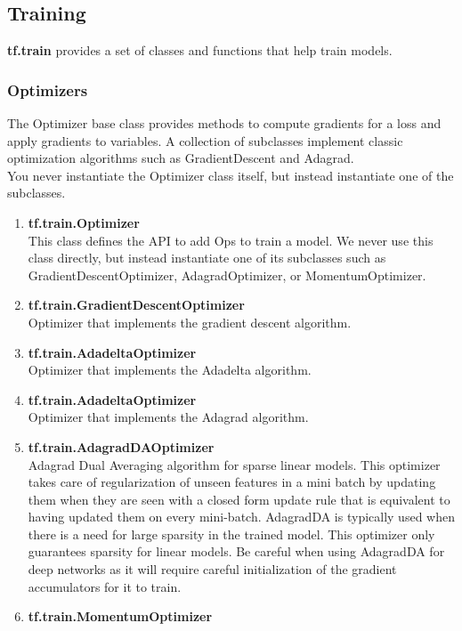   \subsection{Training}
  \textbf{tf.train} provides a set of classes and functions that help train models.
  \subsubsection{Optimizers}
  The Optimizer base class provides methods to compute gradients for a loss and apply gradients to variables. A collection of subclasses implement classic optimization algorithms such as GradientDescent and Adagrad.\\
You never instantiate the Optimizer class itself, but instead instantiate one of the subclasses.
\begin{enumerate}
      \item\textbf{tf.train.Optimizer}\\
      This class defines the API to add Ops to train a model. We never use this class directly, but instead instantiate one of its subclasses such as GradientDescentOptimizer, AdagradOptimizer, or MomentumOptimizer.
      \item\textbf{tf.train.GradientDescentOptimizer}\\
      Optimizer that implements the gradient descent algorithm.
      \item\textbf{tf.train.AdadeltaOptimizer}\\
      Optimizer that implements the Adadelta algorithm.\cite{DBLP:journals/corr/abs-1212-5701}
      \item\textbf{tf.train.AdadeltaOptimizer}\\
      Optimizer that implements the Adagrad algorithm.\cite{Duchi:2011:ASM:1953048.2021068}
      \item\textbf{tf.train.AdagradDAOptimizer}\\
      Adagrad Dual Averaging algorithm for sparse linear models.
This optimizer takes care of regularization of unseen features in a mini batch by updating them when they are seen with a closed form update rule that is equivalent to having updated them on every mini-batch.
AdagradDA is typically used when there is a need for large sparsity in the trained model. This optimizer only guarantees sparsity for linear models. Be careful when using AdagradDA for deep networks as it will require careful initialization of the gradient accumulators for it to train.\cite{Duchi:2011:ASM:1953048.2021068}
      \item\textbf{tf.train.MomentumOptimizer}\\

\end{enumerate}
